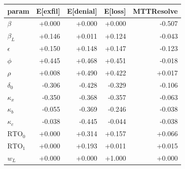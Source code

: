 \begin{tabular}{@{}lrrrr@{}}
\toprule
param & E[exfil] & E[denial] & E[loss] & MTTResolve\\
\midrule
$\beta$ & +0.000 & +0.000 & +0.000 & -0.507\\
$\beta_L$ & +0.146 & +0.011 & +0.124 & -0.043\\
$\epsilon$ & +0.150 & +0.148 & +0.147 & -0.123\\
$\phi$ & +0.445 & +0.468 & +0.451 & -0.018\\
$\rho$ & +0.008 & +0.490 & +0.422 & +0.017\\
$\delta_0$ & -0.306 & -0.428 & -0.329 & -0.106\\
$\kappa_x$ & -0.350 & -0.368 & -0.357 & -0.063\\
$\kappa_b$ & -0.055 & -0.369 & -0.246 & -0.038\\
$\kappa_c$ & -0.038 & -0.445 & -0.044 & -0.038\\
$\mathrm{RTO}_0$ & +0.000 & +0.314 & +0.157 & +0.066\\
$\mathrm{RTO}_1$ & +0.000 & +0.193 & +0.011 & +0.015\\
$w_L$ & +0.000 & +0.000 & +1.000 & +0.000\\
\bottomrule
\end{tabular}
